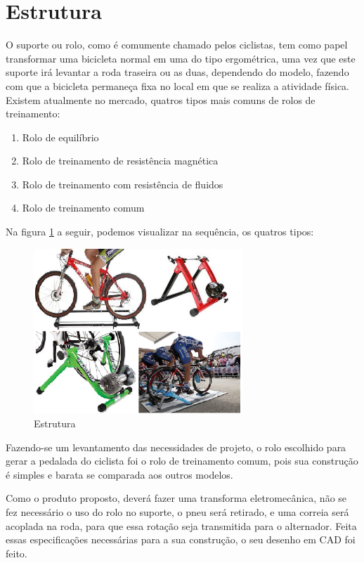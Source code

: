 \section{Estrutura} \label{Secao Estrutura}

O suporte ou rolo, como é comumente chamado pelos ciclistas, tem como papel transformar uma bicicleta normal em uma do tipo ergométrica, uma vez que este suporte irá levantar a roda traseira ou as duas, dependendo do modelo, fazendo com que a bicicleta permaneça fixa no local em que se realiza a atividade física.  Existem atualmente no mercado, quatros tipos mais comuns de rolos de treinamento:
\begin{enumerate}
    \item Rolo de equilíbrio
    \item Rolo de treinamento de resistência magnética
    \item Rolo de treinamento com resistência de fluidos
    \item Rolo de treinamento comum
\end{enumerate}

Na figura \ref{fig:rolos} a seguir, podemos visualizar na sequência, os quatros tipos:

\begin{figure}[h]
    \centering
    \includegraphics[width=0.7\textwidth]{figuras/rolos.png}
    \caption{Estrutura}
    \label{fig:rolos}
\end{figure}

Fazendo-se um levantamento das necessidades de projeto, o rolo escolhido para gerar a pedalada do ciclista foi o rolo de treinamento comum, pois sua construção é simples e barata se comparada aos outros modelos. 

Como o produto proposto, deverá fazer uma transforma eletromecânica, não se fez necessário o uso do rolo no suporte,  o pneu será retirado, e uma correia será acoplada na roda, para que essa rotação seja transmitida para o alternador. Feita essas especificações necessárias para a sua construção, o seu desenho em CAD foi feito. 

